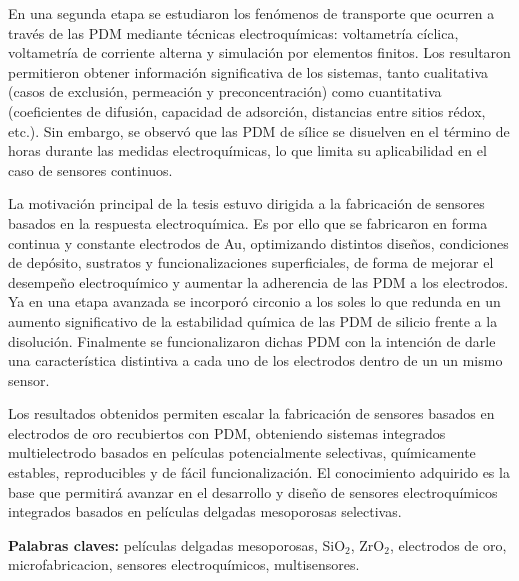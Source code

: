 En una segunda etapa se estudiaron los fenómenos de transporte que ocurren a través de las PDM mediante técnicas electroquímicas: voltametría cíclica, voltametría de corriente alterna y simulación por elementos finitos. Los resultaron permitieron obtener información significativa de los sistemas, tanto cualitativa (casos de exclusión, permeación y preconcentración) como cuantitativa (coeficientes de difusión, capacidad de adsorción, distancias entre sitios rédox, etc.). Sin embargo, se observó que las PDM de sílice se disuelven en el término de horas durante las medidas electroquímicas, lo que limita su aplicabilidad en el caso de sensores continuos.

La motivación principal de la tesis estuvo dirigida a la fabricación de sensores basados en la respuesta electroquímica. Es por ello que se fabricaron en forma continua y constante electrodos de Au, optimizando distintos diseños, condiciones de depósito, sustratos y funcionalizaciones superficiales, de forma de mejorar el desempeño electroquímico y aumentar la adherencia de las PDM a los electrodos. Ya en una etapa avanzada se incorporó circonio a los soles lo que redunda en un aumento significativo de la estabilidad química de las PDM de silicio frente a la disolución. Finalmente se funcionalizaron dichas PDM con la intención de darle una característica distintiva a cada uno de los electrodos dentro de un un mismo sensor.

Los resultados obtenidos permiten escalar la fabricación de sensores basados en electrodos de oro recubiertos con PDM, obteniendo sistemas integrados multielectrodo basados en películas potencialmente selectivas, químicamente estables, reproducibles y de fácil funcionalización. El conocimiento adquirido es la base que permitirá avanzar en el desarrollo y diseño de sensores electroquímicos integrados basados en películas delgadas mesoporosas selectivas. 
\vspace*{\fill}

\vfill

\noindent\textbf{Palabras claves:} películas delgadas mesoporosas, SiO$_2$, ZrO$_2$, electrodos de oro, microfabricacion, sensores electroquímicos, multisensores.

\cleardoublepage
